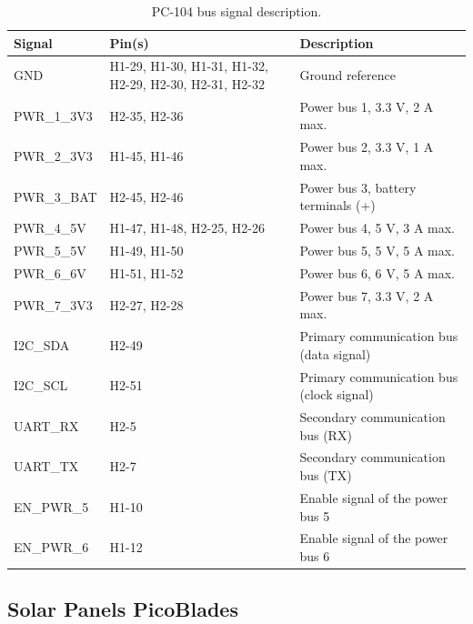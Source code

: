 \begin{table}[!h]
    \centering
    \begin{tabular}{lL{0.29\textwidth}L{0.47\textwidth}}
        \toprule[1.5pt]
        \textbf{Signal}  & \textbf{Pin(s)}            & \textbf{Description} \\
        \midrule
        GND              & H1-29, H1-30, H1-31, H1-32, H2-29, H2-30, H2-31, H2-32 & Ground reference \\
        PWR\_1\_3V3      & H2-35, H2-36               & Power bus 1, 3.3 V, 2 A max. \\
        PWR\_2\_3V3      & H1-45, H1-46               & Power bus 2, 3.3 V, 1 A max. \\
        PWR\_3\_BAT      & H2-45, H2-46               & Power bus 3, battery terminals (+) \\
        PWR\_4\_5V       & H1-47, H1-48, H2-25, H2-26 & Power bus 4, 5 V, 3 A max. \\
        PWR\_5\_5V       & H1-49, H1-50               & Power bus 5, 5 V, 5 A max. \\
        PWR\_6\_6V       & H1-51, H1-52               & Power bus 6, 6 V, 5 A max. \\
        PWR\_7\_3V3      & H2-27, H2-28               & Power bus 7, 3.3 V, 2 A max. \\
        I2C\_SDA         & H2-49                      & Primary communication bus (data signal) \\
        I2C\_SCL         & H2-51                      & Primary communication bus (clock signal) \\
        UART\_RX         & H2-5                       & Secondary communication bus (RX) \\
        UART\_TX         & H2-7                       & Secondary communication bus (TX) \\
        EN\_PWR\_5       & H1-10                      & Enable signal of the power bus 5 \\
        EN\_PWR\_6       & H1-12                      & Enable signal of the power bus 6 \\
        \bottomrule[1.5pt]
    \end{tabular}
    \caption{PC-104 bus signal description.}
    \label{tab:pc104-signals}
\end{table}

\subsection{Solar Panels PicoBlades}


